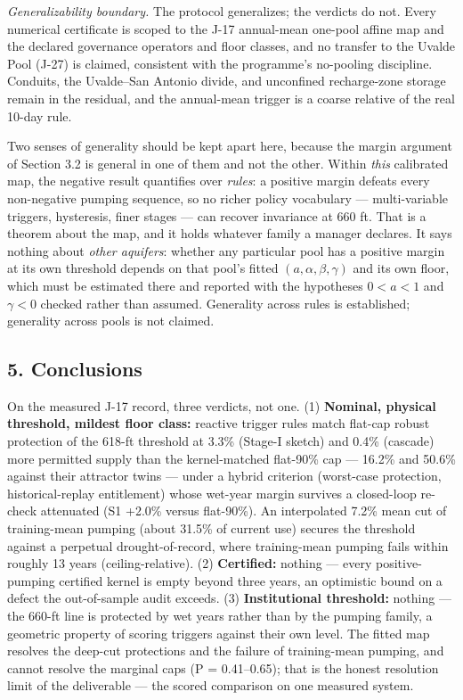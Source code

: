 \documentclass[11pt]{article}
\begin{document}
\emph{Generalizability boundary.} The protocol generalizes; the verdicts
do not. Every numerical certificate is scoped to the J-17 annual-mean
one-pool affine map and the declared governance operators and floor
classes, and no transfer to the Uvalde Pool (J-27) is claimed,
consistent with the programme's no-pooling discipline. Conduits, the
Uvalde--San Antonio divide, and unconfined recharge-zone storage remain
in the residual, and the annual-mean trigger is a coarse relative of the
real 10-day rule.

Two senses of generality should be kept apart here, because the margin
argument of Section 3.2 is general in one of them and not the other.
Within \emph{this} calibrated map, the negative result quantifies over
\emph{rules}: a positive margin defeats every non-negative pumping
sequence, so no richer policy vocabulary --- multi-variable triggers,
hysteresis, finer stages --- can recover invariance at 660 ft. That is a
theorem about the map, and it holds whatever family a manager declares.
It says nothing about \emph{other aquifers}: whether any particular pool
has a positive margin at its own threshold depends on that pool's fitted
\((a, \alpha, \beta, \gamma)\) and its own floor, which must be
estimated there and reported with the hypotheses \(0 < a < 1\) and
\(\gamma < 0\) checked rather than assumed. Generality across rules is
established; generality across pools is not claimed.

\subsection{5. Conclusions}\label{conclusions}

On the measured J-17 record, three verdicts, not one. (1)
\textbf{Nominal, physical threshold, mildest floor class:} reactive
trigger rules match flat-cap robust protection of the 618-ft threshold
at 3.3\% (Stage-I sketch) and 0.4\% (cascade) more permitted supply than
the kernel-matched flat-90\% cap --- 16.2\% and 50.6\% against their
attractor twins --- under a hybrid criterion (worst-case protection,
historical-replay entitlement) whose wet-year margin survives a
closed-loop re-check attenuated (S1 +2.0\% versus flat-90\%). An
interpolated 7.2\% mean cut of training-mean pumping (about 31.5\% of
current use) secures the threshold against a perpetual
drought-of-record, where training-mean pumping fails within roughly 13
years (ceiling-relative). (2) \textbf{Certified:} nothing --- every
positive-pumping certified kernel is empty beyond three years, an
optimistic bound on a defect the out-of-sample audit exceeds. (3)
\textbf{Institutional threshold:} nothing --- the 660-ft line is
protected by wet years rather than by the pumping family, a geometric
property of scoring triggers against their own level. The fitted map
resolves the deep-cut protections and the failure of training-mean
pumping, and cannot resolve the marginal caps (P = 0.41--0.65); that is
the honest resolution limit of the deliverable --- the scored comparison
on one measured system.
\end{document}
